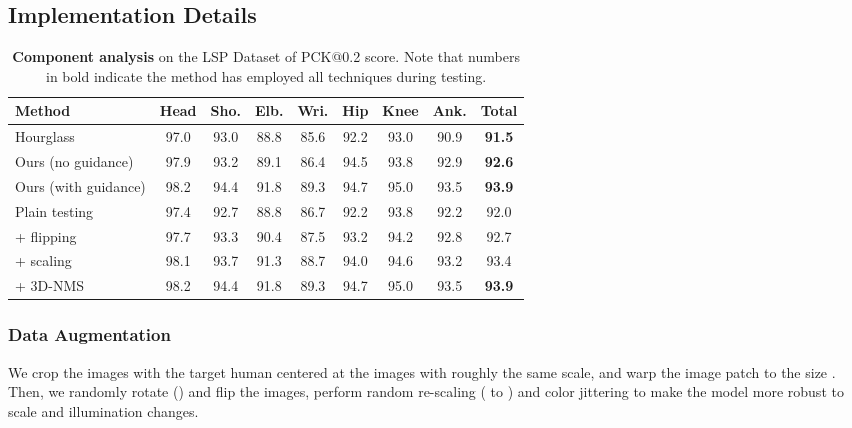 \documentclass[journal ]{IEEEtran}
\begin{document}
\subsection{Implementation Details}

\begin{table*}[t]
\small
	\tabcolsep=0.22cm
	\begin{center}
		\begin{tabular}{|l|c c c c c c c c|}
			\hline
			Method &Head &Sho. & Elb. & Wri. & Hip & Knee & Ank.  &Total \\
			\hline\hline
			Hourglass &97.0  & 93.0  & 88.8  & 85.6  & 92.2  & 93.0 & 90.9 & \textbf{91.5}  \\
			Ours (no guidance)  & 97.9  & 93.2  & 89.1  & 86.4  & 94.5  & 93.8 & 92.9 & \textbf{92.6} \\
			Ours (with guidance)  & 98.2  & 94.4  & 91.8  & 89.3  & 94.7  & 95.0 & 93.5 & \textbf{93.9} \\
			
			\hline
			Plain testing   
			& 97.4  & 92.7  & 88.8  & 86.7  & 92.2  & 93.8 & 92.2 & 92.0 \\
			\quad\quad + flipping  & 97.7  & 93.3  & 90.4  & 87.5  & 93.2  & 94.2 & 92.8 & 92.7 \\
			\quad\quad\quad + scaling  & 98.1  & 93.7  & 91.3  & 88.7  & 94.0  & 94.6 & 93.2 & 93.4  \\
			\quad\quad\quad\quad + 3D-NMS   & 98.2  & 94.4  & 91.8  & 89.3  & 94.7  & 95.0 & 93.5 & \textbf{93.9} \\
			\hline
		\end{tabular}
	\end{center}
	
	\caption{\textbf{Component analysis} on the LSP Dataset of PCK@0.2 score. Note that numbers in bold indicate the method has employed all techniques during testing.}
	\label{table:component-analysis}
\end{table*}

\subsubsection{Data Augmentation}
We crop the images with the target human centered at the images with roughly the same scale, and warp the image patch to the size . Then, we randomly rotate () and flip the images, perform random re-scaling ( to ) and color jittering to make the model more robust to scale and illumination changes. 
\end{document}
